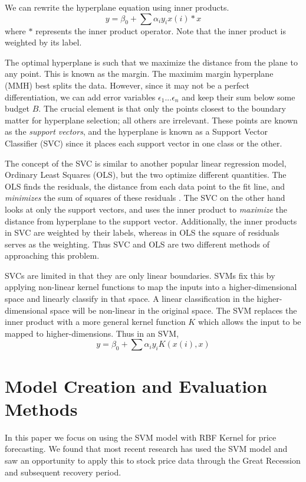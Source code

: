 \documentclass[pageno]{jpaper}
\begin{document}
We can rewrite the hyperplane equation using inner products.
$$y = \beta_0 + \sum \alpha_iy_ix(i)*x$$
where $*$ represents the inner product operator. Note that the inner product is weighted by its label. 

The optimal hyperplane is such that we maximize the distance from the plane to any point. This is known as the margin. The maximim margin hyperplane (MMH) best splits the data. However, since it may not be a perfect differentiation, we can add error variables $\epsilon_1 ... \epsilon_n$ and keep their sum below some budget $B$. The crucial element is that only the points closest to the boundary matter for hyperplane selection; all others are irrelevant. These points are known as the {\em support vectors}, and the hyperplane is known as a Support Vector Classifier (SVC) since it places each support vector in one class or the other.

The concept of the SVC is similar to another popular linear regression model, Ordinary Least Squares (OLS), but the two optimize different quantities. The OLS finds the residuals, the distance from each data point to the fit line, and {\em minimizes} the sum of squares of these residuals \cite{watson}. The SVC on the other hand looks at only the support vectors, and uses the inner product to {\em maximize} the distance from hyperplane to the support vector. Additionally, the inner products in SVC are weighted by their labels, whereas in OLS the square of residuals serves as the weighting. Thus SVC and OLS are two different methods of approaching this problem.

SVCs are limited in that they are only linear boundaries. SVMs fix this by applying non-linear kernel functions to map the inputs into a higher-dimensional space and linearly classify in that space. A linear classification in the higher-dimensional space will be non-linear in the original space. The SVM replaces the inner product with a more general kernel function $K$ which allows the input to be mapped to higher-dimensions. Thus in an SVM,
$$y = \beta_0 + \sum \alpha_i y_i K(x(i),x)$$

\section{Model Creation and Evaluation Methods}
In this paper we focus on using the SVM model with RBF Kernel for price forecasting. We found that most recent research has used the SVM model and saw an opportunity to apply this to stock price data through the Great Recession and subsequent recovery period. 
\end{document}
